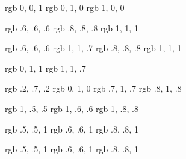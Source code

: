 

\definecolor{hint.info}      {rgb} {0, 0, 1}
\definecolor{hint.example}   {rgb} {0, 1, 0} 
\definecolor{hint.important} {rgb} {1, 0, 0}

\definecolor{prim.head} {rgb} {.6, .6, .6}
\definecolor{prim.light} {rgb} {.8, .8, .8}
\definecolor{prim.dark} {rgb} {1, 1, 1}

\definecolor{struct.head} {rgb} {.6, .6, .6}
\definecolor{struct.subhead} {rgb} {1, 1, .7}
\definecolor{struct.light} {rgb} {.8, .8, .8}
\definecolor{struct.dark} {rgb} {1, 1, 1}

\definecolor{sendstruct.subhead} {rgb} {0, 1, 1}
\definecolor{sendstruct.list} {rgb} {1, 1, .7}


\definecolor{send.head} {rgb} {.2, .7, .2}
\definecolor{send.subhead} {rgb} {0, 1, 0}
\definecolor{send.light} {rgb} {.7, 1, .7}
\definecolor{send.dark} {rgb} {.8, 1, .8}

\definecolor{recv.head} {rgb} {1, .5, .5}
\definecolor{recv.light} {rgb} {1, .6, .6}
\definecolor{recv.dark} {rgb} {1, .8, .8}

\definecolor{evnt.head} {rgb} {.5, .5, 1} %
\definecolor{evnt.light} {rgb} {.6, .6, 1} %
\definecolor{evnt.dark} {rgb} {.8, .8, 1} %


\definecolor{typedef.head} {rgb} {.5, .5, 1}
\definecolor{typedef.light} {rgb} {.6, .6, 1}
\definecolor{typedef.dark} {rgb} {.8, .8, 1}

\newenvironment{info}{\begin{tcolorbox}[colback=hint.info!2,colframe=hint.info!70!black,title=\textsc{Info}]}{\end{tcolorbox}}
\newenvironment{infocont}{\begin{tcolorbox}[colback=hint.info!2,colframe=hint.info!70!black,title=\textsc{Info (Cont.)}]}{\end{tcolorbox}}
\newenvironment{wichtig}{\begin{tcolorbox}[colback=hint.important!2,colframe=hint.important!70!black,title=\textsc{Important}]}{\end{tcolorbox}}
\newenvironment{beispiel}{\begin{tcolorbox}[colback=hint.example!2,colframe=hint.example!70!black,title=\textsc{Example}]}{\end{tcolorbox}}

